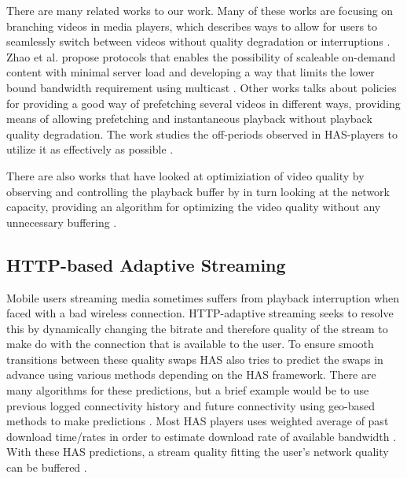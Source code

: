 \documentclass[9pt,a4paper]{acmproc}
\begin{document}
There are many related works to our work. Many of these works are focusing on branching videos in media players, which describes ways to allow for users to seamlessly switch between videos without quality degradation or interruptions \cite{qualbranch, hasmultipath,scalableOnDemand}. Zhao et al. \cite{scalableOnDemand} propose protocols that enables the possibility of scaleable on-demand content with minimal server load and developing a way that limits the lower bound bandwidth requirement using multicast \cite{scalableOnDemand}. Other works talks about policies for providing a good way of prefetching several videos in different ways, providing means of allowing prefetching and instantaneous playback without playback quality degradation. The work studies the off-periods observed in HAS-players to utilize it as effectively as possible \cite{bandawarePrefetch}.

There are also works that have looked at optimiziation of video quality by observing and controlling the playback buffer by in turn looking at the network capacity, providing an algorithm for optimizing the video quality without any unnecessary buffering \cite{bufferbased}.

\subsection{HTTP-based Adaptive Streaming}
Mobile users streaming media sometimes suffers from playback interruption when faced with a bad wireless connection. HTTP-adaptive streaming seeks to resolve this by dynamically changing the bitrate and therefore quality of the stream to make do with the connection that is available to the user. To ensure smooth transitions between these quality swaps HAS also tries to predict the swaps in advance using various methods depending on the HAS framework. There are many algorithms for these predictions, but a brief example would be to use previous logged connectivity history and future connectivity using geo-based methods to make predictions \cite{gtube}. Most HAS players uses weighted average of past download time/rates in order to estimate download rate of available bandwidth \cite{qualbranch}. With these HAS predictions, a stream quality fitting the user’s network quality can be buffered \cite{gtube}.
\end{document}
